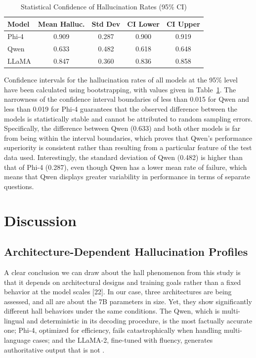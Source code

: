 \documentclass[conference]{IEEEtran}
\begin{document}
\begin{table}[h]
\centering
\caption{Statistical Confidence of Hallucination Rates (95\% CI)}
\label{tab:confidence}
\begin{tabular}{lcccc}
\hline
\textbf{Model} & \textbf{Mean Halluc.} & \textbf{Std Dev} 
& \textbf{CI Lower} & \textbf{CI Upper} \\
\hline
Phi-4  & 0.909 & 0.287 & 0.900 & 0.919 \\
Qwen   & 0.633 & 0.482 & 0.618 & 0.648 \\
LLaMA  & 0.847 & 0.360 & 0.836 & 0.858 \\
\hline
\end{tabular}
\end{table}

Confidence intervals for the hallucination rates of all 
models at the 95\% level have been calculated using 
bootstrapping, with values given in Table~\ref{tab:confidence}. 
The narrowness of the confidence interval boundaries of less 
than 0.015 for Qwen and less than 0.019 for Phi-4 
guarantees that the observed difference between the models 
is statistically stable and cannot be attributed to random 
sampling errors. Specifically, the difference between Qwen 
(0.633) and both other models is far from being within the 
interval boundaries, which proves that Qwen's performance 
superiority is consistent rather than resulting from a 
particular feature of the test data used. Interestingly, the 
standard deviation of Qwen (0.482) is higher than that 
of Phi-4 (0.287), even though Qwen has a lower mean rate of 
failure, which means that Qwen displays greater 
variability in performance in terms of separate questions.

\section{Discussion}

\subsection{Architecture-Dependent Hallucination Profiles}

A clear conclusion we can draw about the hall
phenomenon from this study is that it depends on architectural
designs and training goals rather than a fixed behavior at the
model scales [22]. In our case, three architectures are being
assessed, and all are about the 7B parameters in size. Yet,
they show significantly different hall behaviors under the same
conditions. The Qwen, which is multi-lingual and
deterministic in its decoding procedure, is the most factually
accurate one; Phi-4, optimized for efficiency, fails
catastrophically when handling multi-language cases; and the
LLaMA-2, fine-tuned with fluency, generates authoritative
output that is not \cite{b24}.
\end{document}
